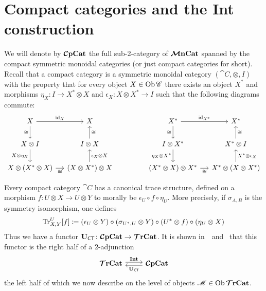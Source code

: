 \documentclass[12pt,oneside,article,draft]{memoir}
\begin{document}
\section{Compact categories and the Int construction}\label{sec:compact_and_int}

We will denote by $\bm{\mathcal{C}}\mathbf{pCat}$ the full sub-2-category of $\bm{\mathcal{M}}\mathbf{nCat}$ spanned by the compact symmetric
monoidal categories (or just compact categories for short).  Recall that a compact category is a
symmetric monoidal category $(\cat{C},\otimes,I)$ with the property that for every object
$X\in\operatorname{Ob}\mathscr{C}$ there exists an object $X^*$ and morphisms $\eta_X\colon I\to X^*\otimes X$ and
$\epsilon_X\colon X\otimes X^*\to I$ such that the following diagrams commute:
\begin{equation*}
   \begin{tikzcd}[column sep=small]
      X\arrow[r,"\id_X"]\arrow[d,"\cong"'] & X \\
      X\otimes I\arrow[d,"X\otimes\eta_X"'] & I\otimes X\arrow[u,"\cong"'] \\
      X\otimes(X^*\otimes X)\arrow[r,"\cong"'] & (X\otimes X^*)\otimes X\arrow[u,"\epsilon_X\otimes X"']
   \end{tikzcd}
   \hspace{.6in}
   \begin{tikzcd}[column sep=small]
      X^*\arrow[r,"\id_{X^*}"]\arrow[d,"\cong"'] & X^*\\
      I\otimes X^*\arrow[d,"\eta_X\otimes X^*"'] & X^*\otimes I\arrow[u,"\cong"'] \\
      (X^*\otimes X)\otimes X^*\arrow[r,"\cong"'] & X^*\otimes (X\otimes X^*)\arrow[u,"X^*\otimes\epsilon_X"']
   \end{tikzcd}
\end{equation*}

Every compact category $\cat{C}$ has a canonical trace structure, defined on a morphism $f\colon
U\otimes X\to U\otimes Y$ to morally be $\epsilon_U\circ f\circ \eta_U$. More precisely, if
$\sigma_{A,B}$ is the symmetry isomorphism, one defines
\begin{equation*}
   \operatorname{Tr}^U_{X,Y}[f]\coloneqq(\epsilon_U\otimes Y)\circ (\sigma_{U^*,U}\otimes Y)\circ (U^*\otimes f)\circ (\eta_U\otimes X)
\end{equation*}
Thus we have a functor $\mathbf{U}_{\mathsf{CT}}\colon\bm{\mathcal{C}}\mathbf{pCat}\to\bm{\mathcal{T}}\mathbf{rCat}$. It is shown in~\cite{JoyalStreetVerity}~and~\cite{HK} that
this functor is the right half of a 2-adjunction
\begin{equation}\label{dia:traced_compact_adjunction}
\begin{tikzcd}
   \TTrCat\arrow[r,shift left=.5ex, "\Int"]&\CCompCat\arrow[l,shift left=.5ex,"\UCT"]
\end{tikzcd}
\end{equation}
the left half of which we now describe on the level of objects $\mathscr{M}\in\operatorname{Ob}\bm{\mathcal{T}}\mathbf{rCat}$.
\end{document}
